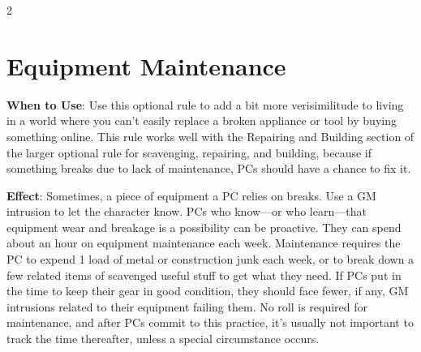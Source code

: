\begin{multicols}{2}
\section{Equipment Maintenance}

\textbf{When to Use}: Use this optional rule to add a bit more verisimilitude to living in a world where you can’t easily replace a broken appliance or tool by buying something online. This rule works well with the Repairing and Building section of the larger optional rule for scavenging, repairing, and building, because if something breaks due to lack of maintenance, PCs should have a chance to fix it.

\textbf{Effect}: Sometimes, a piece of equipment a PC relies on breaks. Use a GM intrusion to let the character know. PCs who know—or who learn—that equipment wear and breakage is a possibility can be proactive. They can spend about an hour on equipment maintenance each week. Maintenance requires the PC to expend 1 load of metal or construction junk each week, or to break down a few related items of scavenged useful stuff to get what they need. If PCs put in the time to keep their gear in good condition, they should face fewer, if any, GM intrusions related to their equipment failing them. No roll is required for maintenance, and after PCs commit to this practice, it’s usually not important to track the time thereafter, unless a special circumstance occurs. 

\end{multicols}

